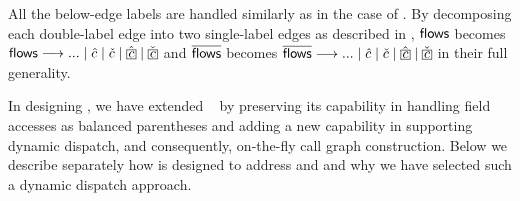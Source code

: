 \begin{comment}
If $O\; \flowsto\; v$,  then $v$ is
\LF-reachable from $O$, i.e., $O$ flows to $v$, implying that $v$ points to $O$.
In fact, $\iflowsto$ is the inverse of the $\flowsto$ relation, representing
the standard points-to relation. Thus,
if $v\; \iflowsto\; O$,  then $v$ points to $O$.
Note that $\iflows$ is  also the
inverse of \flows. When computing the points-to information, we need
to traverse the edges in \pag forwards to establish \flowsto and
\flows and also backwards to establish $\iflowsto$ and $\iflows$, with both
performed recursively (due to the need for resolving the aliases in the
program).
\end{comment}

All the below-edge
labels are handled similarly as in the case of \manuLF. By
decomposing each double-label edge into
two single-label edges as described in
, $\textsf{flows}$ becomes
$\flows \longrightarrow ... \mid \hat{c} \mid \check{c} \mid
\hat{\boxed{c}} \mid \check{\boxed{c}}  $  and
$\overline{\textsf{flows}}$ becomes
$\iflows \longrightarrow ... \mid \hat{c} \mid \check{c} \mid
\hat{\boxed{c}} \mid \check{\boxed{c}}  $ 
in their full generality.

In designing \LF, we have extended 
\manuLF~\cite{sridharan2005demand, sridharan2006refinement} by
preserving its capability in handling field accesses as balanced parentheses
and adding a new capability in supporting dynamic dispatch, and consequently, on-the-fly
call graph construction. Below we describe separately how \LF is designed to 
address  and  and why we have selected
such a dynamic dispatch approach.
 
\begin{comment}
Given a virtual 
callsite
$\mathtt{x = } ~ a_0.\mathtt{m}(a_1,..., a_r)$,
the key novelty in addressing
 \challenge{1} and \challenge{2} (facilitated by the PAG designed according to
 the rules given in 
 \Cref{fig:newcflpag})
is to first store  $a_i$ ($1\leqslant i
\leqslant r$)  into $a_0.i$, then discover the dynamic type $t$ of every receiver object
pointed by $a_0$ and propagate $t$ to this callsite  (and others invoked on
$\texttt{this}^{m'}$ in $m'$) in terms of
 $\new[t]~(\flows~|\linebreak \indispatch[t])^*$,  where $ m' = \lookup(\texttt{m}, t)$,
and finally, retrieve $a_i$ (available now in
$\texttt{this}^{m'}.i$) and pass it to $p_i^{m'}$.
\end{comment}

